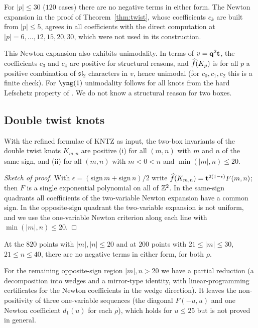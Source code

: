 \begin{compresult}
For $|p|\le30$ ($120$ cases) there are no negative terms in either form.
The Newton expansion in the proof of Theorem~\ref{thm:twist}, whose coefficients $c_k$ are built from $|p|\le5$, agrees in all coefficients with the direct computation at $|p|=6,\dots,12,15,20,30$, which were not used in its construction.
\end{compresult}
This Newton expansion also exhibits unimodality.
In terms of $v=\mathbf{q}^2\mathbf{t}$, the coefficients $c_3$ and $c_4$ are positive for structural reasons, and $\widehat{f}(K_p)$ is for all $p$ a positive combination of $\mathfrak{sl}_2$ characters in $v$, hence unimodal
(for $c_0,c_1,c_2$ this is a finite check).
For $\yng(1)$ unimodality follows for all knots from the hard Lefschetz property of \cite{Gorsky21}. We do not know a structural reason for two boxes.

\subsection{Double twist knots}
\begin{theorem}\label{thm:pretzel}
With the refined formulae of KNTZ as input, the two-box invariants of the double twist knots $K_{m,n}$ are positive
{\rm(i)} for all $(m,n)$ with $m$ and $n$ of the same sign, and
{\rm(ii)} for all $(m,n)$ with $m<0<n$ and $\min(|m|,n)\le20$.
\end{theorem}
\begin{proof}[Sketch of proof]
With $\epsilon=(\mathrm{sign}\,m+\mathrm{sign}\,n)/2$ write $\widehat{f}(K_{m,n})=\mathbf{t}^{2(1-\epsilon)}F(m,n)$; then $F$ is a single exponential polynomial on all of $\mathbb{Z}^2$.
In the same-sign quadrants all coefficients of the two-variable Newton expansion have a common sign.
In the opposite-sign quadrant the two-variable expansion is not uniform, and we use the one-variable Newton criterion along each line with $\min(|m|,n)\le20$.
\end{proof}
\begin{compresult}
At the $820$ points with $|m|,|n|\le20$ and at $200$ points with $21\le|m|\le30$, $21\le n\le40$, there are no negative terms in either form, for both $\rho$.
\end{compresult}
For the remaining opposite-sign region $|m|,n>20$ we have a partial reduction (a decomposition into wedges and a mirror-type identity, with linear-programming certificates for the Newton coefficients in the wedge direction).
It leaves the non-positivity of three one-variable sequences (the diagonal $F(-u,u)$ and one Newton coefficient $d_1(u)$ for each $\rho$), which holds for $u\le25$ but is not proved in general.

